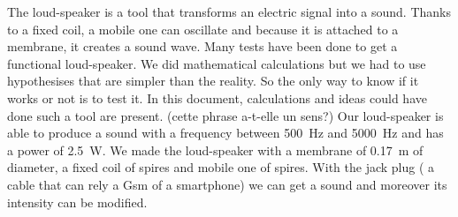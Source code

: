 

\begin{abstract-en}
The loud-speaker is a tool that transforms an electric signal into a sound.  Thanks to a fixed coil,
a mobile one can oscillate and because it is attached to a membrane, it creates a sound wave.  
Many tests have been done to get a functional loud-speaker. 
We did mathematical calculations but we had to use hypothesises that are simpler than the reality.
So the only way to know if it works or not is to test it.
In this document, calculations and ideas could have done such a tool are present.  (cette phrase a-t-elle un sens?)
Our loud-speaker is able to produce a sound with a frequency between \SI{500}{\hertz} and \SI{5000}{\hertz}
and has a power of \SI{2.5}{\watt}.  We made the loud-speaker with a membrane of \SI{0.17}{\meter} of diameter,
a fixed coil of  spires and mobile one of  spires.  
With the jack plug ( a cable that can rely a Gsm of a smartphone) we can get a sound and moreover 
its intensity can be modified.
\end{abstract-en}


